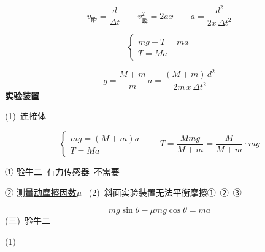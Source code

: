 \[
v_{\text{瞬}}=\frac{d}{\Delta t}\qquad v_{\text{瞬}}^2=2ax\qquad a=\frac{d^2}{2x\,\Delta t^2}
\]

\[
\begin{cases} mg-T=ma\\ T=Ma\end{cases}
\]

\[
g=\frac{M+m}{m}\,a=\frac{(M+m)\,d^2}{2m\,x\,\Delta t^2}
\]
\textbf{实验装置}

(1)\ 连接体


\[
\begin{cases} mg=(M+m)a\\ T=Ma\end{cases}\qquad T=\frac{Mmg}{M+m}=\frac{M}{M+m}\cdot mg
\]

① \underline{验牛二}\ \quad 有力传感器\ 不需要


② 测量\underline{动摩擦因数$\mu$}\  %
(2)\ 斜面实验装置\quad 无法平衡摩擦\quad ①\ ②\ ③ %


\[
mg\sin\theta-\mu mg\cos\theta=ma
\]
(三)\ 验牛二

(1)




